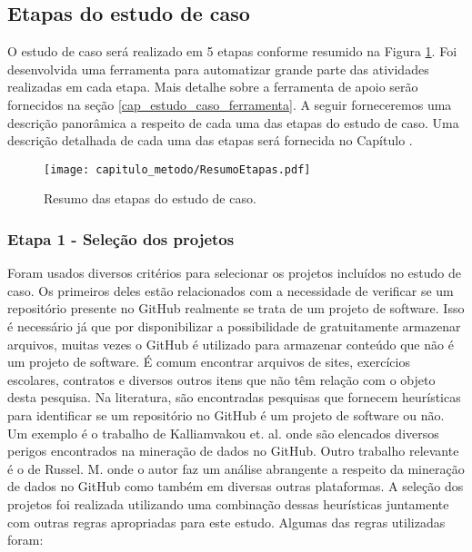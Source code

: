 \subsection{Etapas do estudo de caso}



 O estudo de caso será realizado em 5 etapas conforme resumido na  Figura \ref{fig:cap_metodo_resumo_etapas}.  Foi desenvolvida  uma ferramenta para automatizar grande parte das atividades realizadas em cada etapa. Mais detalhe sobre a ferramenta de apoio serão fornecidos na seção \ref{cap_estudo_caso_ferramenta}. A seguir forneceremos uma descrição panorâmica a respeito de cada uma das etapas do estudo de caso. Uma descrição detalhada de cada uma das etapas será fornecida no Capítulo \cite{cap_estudo_caso}.
 
\label{sec:Passos_Elaboracao_Modelo}

  \begin{figure}[H]
  \centering
  \texttt{[image: capitulo\_metodo/ResumoEtapas.pdf]} 
  \caption{Resumo das etapas do estudo de caso. }
  \label{fig:cap_metodo_resumo_etapas} 
\end{figure}

\subsubsection{Etapa 1 - Seleção dos projetos} 


Foram usados diversos critérios para selecionar os projetos incluídos no estudo de caso. Os primeiros deles estão relacionados com a necessidade de verificar se um repositório presente no GitHub realmente se trata de um projeto de software. Isso é necessário já que por disponibilizar a possibilidade de gratuitamente armazenar arquivos, muitas vezes o GitHub é utilizado para armazenar conteúdo que não é um projeto de software. É comum encontrar arquivos de sites, exercícios escolares, contratos e diversos outros itens que não têm relação com o objeto desta pesquisa. Na literatura, são encontradas pesquisas que fornecem heurísticas para identificar se um repositório no GitHub é um projeto de software ou não. Um exemplo é  o trabalho de Kalliamvakou et. al.\cite{kalliamvakou2014promises} onde são elencados diversos perigos encontrados na mineração de dados no GitHub. Outro trabalho relevante é o de Russel. M.\cite{russell2013mining} onde o autor faz um análise abrangente a respeito da mineração de dados no GitHub como também em diversas outras plataformas. A seleção dos projetos foi realizada utilizando uma combinação dessas heurísticas juntamente com outras regras apropriadas para este estudo. Algumas das regras utilizadas foram:

